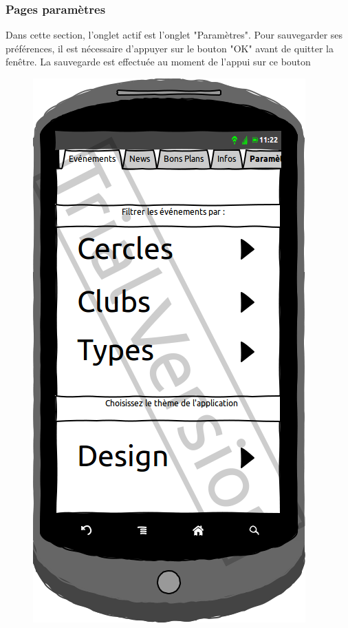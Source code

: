 \documentclass[a4paper, 11px]{article}
\begin{document}
\subsubsection{Pages paramètres}
Dans cette section, l'onglet actif est l'onglet "Paramètres". 
Pour sauvegarder ses préférences, il est nécessaire d'appuyer sur le bouton "OK" avant de quitter la fenêtre. La sauvegarde est effectuée au moment de l'appui sur ce bouton
\begin{figure}[htbp]
	\begin{minipage}[c]{.33\linewidth}
		\begin{center}
			\includegraphics[scale=0.3]{../../Sketch/Android/Param.png}
		\end{center}

\end{minipage}
\end{figure}
\end{document}
